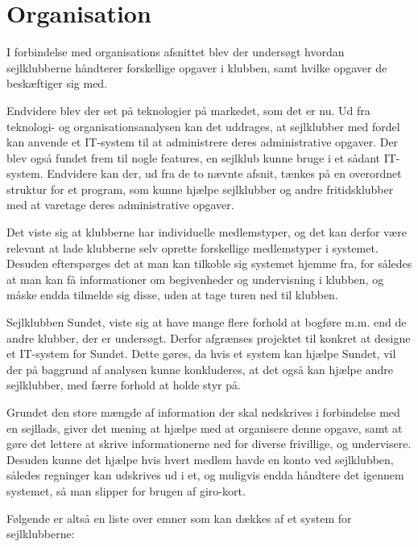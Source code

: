\cbstart
\section{Organisation}
\cbend

I forbindelse med organisations afsnittet blev der undersøgt hvordan sejlklubberne håndterer forskellige opgaver i klubben, samt hvilke opgaver de beskæftiger sig med. 

\cbstart
\cbdelete
Endvidere blev der set på teknologier på markedet, som det er nu. Ud fra teknologi- og organisationsanalysen kan det
uddrages, at sejlklubber med fordel kan anvende et IT-system til at administrere deres administrative opgaver. Der blev
også fundet frem til nogle features, en sejlklub kunne bruge i et sådant IT-system. Endvidere kan der, ud fra de to
nævnte afsnit, tænkes på en overordnet struktur for et program, som kunne hjælpe sejlklubber og andre fritidsklubber med
at varetage deres administrative opgaver.
\cbdelete
\cbend

\cbstart
Det viste sig at klubberne har individuelle medlemstyper, og det kan derfor være relevant at lade klubberne selv oprette forskellige medlemstyper i systemet. Desuden efterspørges det at man kan tilkoble sig systemet hjemme fra, for således at man kan få informationer om begivenheder og undervisning i klubben, og måske endda tilmelde sig disse, uden at tage turen ned til klubben. 
\cbend

\cbstart
\cbdelete
Sejlklubben Sundet, viste sig at have mange flere forhold at bogføre m.m. end de andre klubber, der er undersøgt. Derfor afgrænses projektet til konkret at designe et IT-system for Sundet. Dette gøres, da hvis et system kan hjælpe Sundet, vil der på baggrund af analysen kunne konkluderes, at det også kan hjælpe andre sejlklubber, med færre forhold at holde styr på. 
\cbdelete
\cbend

\cbstart
Grundet den store mængde af information der skal nedskrives i forbindelse med en sejllads, giver det mening at hjælpe med at organisere denne opgave, samt at gøre det lettere at skrive informationerne ned for diverse frivillige, og undervisere. Desuden kunne det hjælpe hvis hvert medlem havde en konto ved sejlklubben, således regninger kan udskrives ud i et, og muligvis endda håndtere det igennem systemet, så man slipper for brugen af giro-kort.
\cbend

Følgende er altså en liste over emner som kan dækkes af et system for sejlklubberne:

